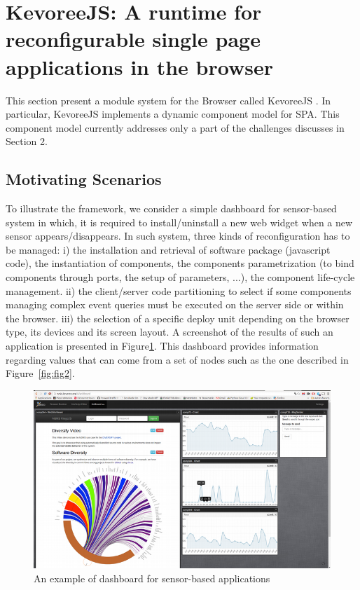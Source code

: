 \section{KevoreeJS: A runtime for reconfigurable single page applications in the browser}

This section present a module system for the Browser called KevoreeJS . 
In particular, KevoreeJS implements a dynamic component model for SPA. 
This component model currently addresses only a part of the challenges discusses in Section 2.   

\subsection{Motivating Scenarios }
To illustrate the framework, we consider a simple dashboard for sensor-based system in which, it is required to install/uninstall a new web widget when a new sensor appears/disappears. In such system, three kinds of reconfiguration has to be managed: i) the installation and retrieval of software package (javascript code), the instantiation of components, the components parametrization (to bind components through ports, the setup of parameters, ...), the component life-cycle management. ii)  the client/server code partitioning to select if some components managing complex event queries must be executed on the server side or within the browser. iii) the selection of a specific deploy unit depending on the browser type, its devices and its screen layout. A screenshot of the results of such an application is presented in Figure\ref{fig:fig1}. This dashboard provides information regarding values that can come from a set of nodes such as the one described in Figure~\ref{fig:fig2}.


\begin{figure}[h]
	\centering
	\includegraphics[width=1\linewidth]{figures/fig3}
	\caption{An example of dashboard for sensor-based applications}
	\label{fig:fig1}
\end{figure}


